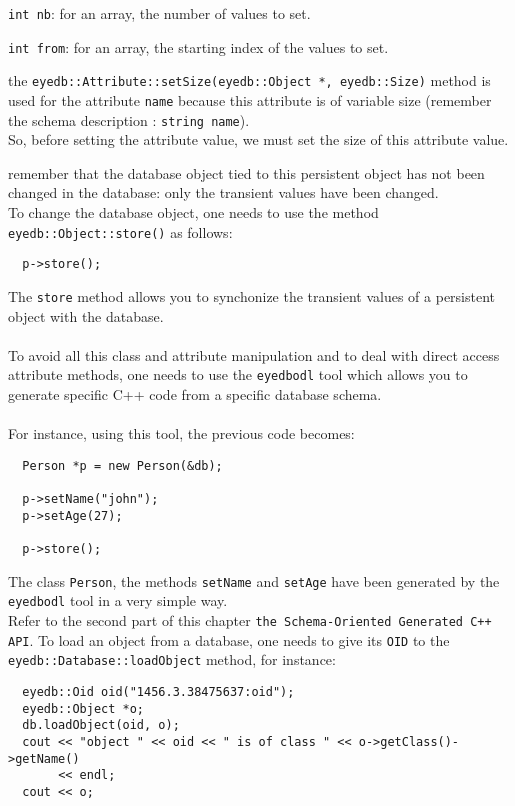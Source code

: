 \item \texttt{int nb}: for an array, the number of values to set.
\item \texttt{int from}: for an array, the starting index of the values to set.
\ee
\item the \texttt{eyedb::Attribute::setSize(eyedb::Object *, eyedb::Size)} method is
used for the attribute \texttt{name} because this attribute is of variable
size (remember the schema description : \texttt{string name}).
\\
So, before setting the attribute value, we must set the size of this
attribute value.
\item remember that the database object tied to this persistent object has not
been changed in the database: only the transient values have been changed.
\\
To change the database object, one needs to use the method
\texttt{eyedb::Object::store()} as follows:
\verbsize
\begin{verbatim}
  p->store();
\end{verbatim}
\normalsize
The \texttt{store} method allows you to synchonize the transient values
of a persistent object with the database.
\\
\\
To avoid all this class and attribute manipulation and to deal with
direct access attribute methods, one needs to use the \texttt{eyedbodl}
tool which allows you to generate specific C++ code from a specific database
schema.
\\
\\
For instance, using this tool, the previous code becomes:
\verbsize
\begin{verbatim}
  Person *p = new Person(&db);

  p->setName("john");
  p->setAge(27);

  p->store();
\end{verbatim}
\normalsize
The class \texttt{Person}, the methods \texttt{setName} and \texttt{setAge}
have been generated by the \texttt{eyedbodl} tool in a very simple way.
\\
Refer to the second part of this chapter \texttt{the Schema-Oriented
Generated C++ API}.
\ee
{}
To load an object from a database, one needs to give its \texttt{OID} to
the \texttt{eyedb::Database::loadObject} method, for instance:
\verbsize
\begin{verbatim}
  eyedb::Oid oid("1456.3.38475637:oid");
  eyedb::Object *o;
  db.loadObject(oid, o);
  cout << "object " << oid << " is of class " << o->getClass()->getName()
       << endl;
  cout << o;
\end{verbatim}
